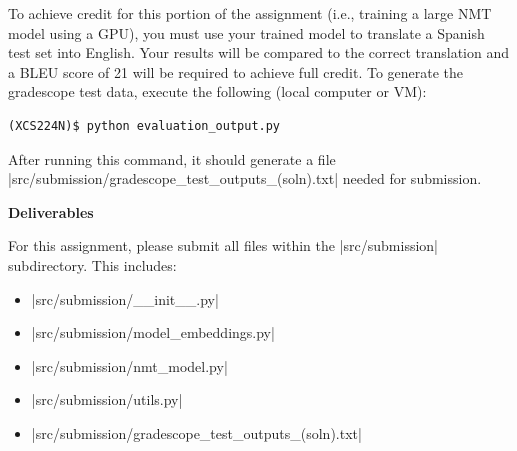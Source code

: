\begin{enumerate}[(a)]
    To achieve credit for this portion of the assignment (i.e., training a large NMT model using a GPU), you must use your trained model to translate a Spanish test set into English.  Your results will be compared to the correct translation and a BLEU score of 21 will be required to achieve full credit.  To generate the gradescope test data, execute the following (local computer or VM):
\begin{lstlisting}
(XCS224N)$ python evaluation_output.py
\end{lstlisting}

    After running this command, it should generate a file |src/submission/gradescope_test_outputs_(soln).txt| needed for submission.

\end{enumerate}
\clearpage

\textbf{Deliverables}

For this assignment, please submit all files within the |src/submission| subdirectory.  This includes:
\begin{itemize}
    \item |src/submission/__init__.py|
    \item |src/submission/model_embeddings.py|
    \item |src/submission/nmt_model.py|
    \item |src/submission/utils.py|
    \item |src/submission/gradescope_test_outputs_(soln).txt|
\end{itemize}   
